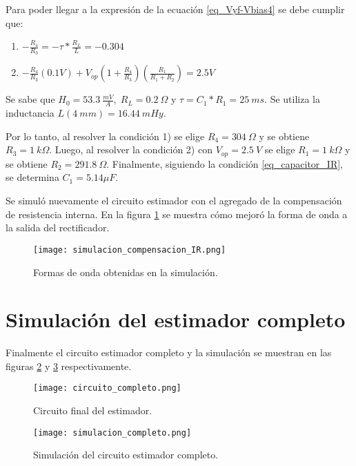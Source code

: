 Para poder llegar a la expresión de la ecuación \ref{eq_Vyf-Vbias4} se debe cumplir que:

\begin{enumerate}
	\item  $-\frac{R_4}{R_3}=- \tau *\frac{R_L}{L}= -0.304$  
	
	\item  $-\frac{R_4}{R_3}(0.1V)+V_{op}(1+\frac{ R_4}{R_3})(\frac{R_1}{R_1+R_2}) = 2.5V$     
\end{enumerate}

Se sabe que $H_0 = 53.3\:\frac{mV}{A},\; R_L = 0.2\:\Omega$ y $\tau=C_1*R_1=25 \:ms$. Se utiliza la inductancia $L(4\:mm) = 16.44\:mHy$.

Por lo tanto, al resolver la condición 1) se elige $R_4 = 304\: \Omega$ y se obtiene $R_3=1\:k\Omega$. Luego, al resolver la condición 2) con $V_{op}=2.5\:V$ se elige $R_1=1\:k\Omega$ y se obtiene $R_{2}=291.8\:\Omega$. Finalmente, siguiendo la condición \ref{eq_capacitor_IR}, se determina $C_1=5.14\mu F$.

Se simuló nuevamente el circuito estimador con el agregado de la compensación de resistencia interna. En la figura \ref{fig:img_Formas_de_onda_obtenidas_en_la_simulación} se muestra cómo mejoró la forma de onda a la salida del rectificador.

\begin{figure}[H]
	\centering
	\texttt{[image: simulacion\_compensacion\_IR.png]}
	\caption{Formas de onda obtenidas en la simulación.}
	\label{fig:img_Formas_de_onda_obtenidas_en_la_simulación}
\end{figure}


\section{Simulación del estimador completo}

Finalmente el circuito estimador completo y la simulación se muestran en las figuras \ref{fig:img_circuito_final_del_estimador} y \ref{fig:img_simulacion_completo} respectivamente.

\begin{figure}[H]
\centering
\texttt{[image: circuito\_completo.png]}
\caption{Circuito final del estimador.}
\label{fig:img_circuito_final_del_estimador}
\end{figure}

\begin{figure}[H]
	\centering
	\texttt{[image: simulacion\_completo.png]}
	\caption{Simulación del circuito estimador completo.}
	\label{fig:img_simulacion_completo}
\end{figure}

